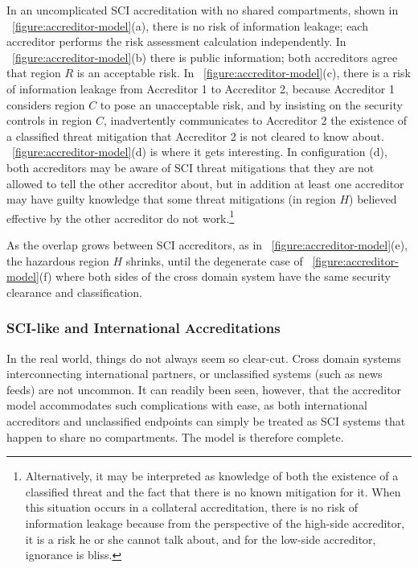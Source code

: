 \documentclass[10pt,letterpaper,conference]{IEEEtran}
\begin{document}
In an uncomplicated SCI accreditation with no shared compartments, shown in
\figurename~\ref{figure:accreditor-model}(a), there is no risk of information leakage; each
accreditor performs the risk assessment calculation independently. In
\figurename~\ref{figure:accreditor-model}(b) there is public information; both accreditors
agree that region $R$ is an acceptable risk. In \figurename~\ref{figure:accreditor-model}(c),
there is a risk of information leakage from Accreditor 1
to Accreditor 2, because Accreditor 1 considers region $C$ to pose an unacceptable risk, and by
insisting on the security controls in region $C$, inadvertently communicates to Accreditor 2 the
existence of a classified threat mitigation that Accreditor 2 is not cleared to know about.
\figurename~\ref{figure:accreditor-model}(d) is where it gets interesting. In configuration (d),
both accreditors may be aware of SCI threat mitigations that they are not allowed to tell the other
accreditor about, but in addition at least one accreditor may have guilty knowledge that some
threat mitigations (in region $H$) believed effective by the other accreditor do not
work.\footnote{Alternatively, it may be interpreted as knowledge of both the existence of
a classified threat and the fact that there is no known mitigation for it. When this situation
occurs in a collateral accreditation, there is no risk of information leakage because from the
perspective of the high-side accreditor, it is a risk he or she cannot talk about, and for the
low-side accreditor, ignorance is bliss.}

As the overlap grows between SCI accreditors, as in \figurename~\ref{figure:accreditor-model}(e),
the hazardous region $H$ shrinks, until the degenerate case of
\figurename~\ref{figure:accreditor-model}(f) where both sides of the cross domain system have
the same security clearance and classification.

\subsubsection{SCI-like and International Accreditations}

In the real world, things do not always seem so clear-cut. Cross domain systems interconnecting
international partners, or unclassified systems (such as news feeds) are not uncommon. It can
readily been seen, however, that the accreditor model accommodates such complications with ease, as
both international accreditors and unclassified endpoints can simply be treated as SCI
systems that happen to share no compartments. The model is therefore complete.
\end{document}
